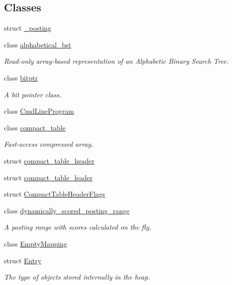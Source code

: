 \subsection*{Classes}
\begin{DoxyCompactItemize}
\item 
struct \mbox{\hyperlink{structirk_1_1__posting}{\+\_\+posting}}
\item 
class \mbox{\hyperlink{classirk_1_1alphabetical__bst}{alphabetical\+\_\+bst}}
\begin{DoxyCompactList}\small\item\em Read-\/only array-\/based representation of an Alphabetic Binary Search Tree. \end{DoxyCompactList}\item 
class \mbox{\hyperlink{classirk_1_1bitptr}{bitptr}}
\begin{DoxyCompactList}\small\item\em A bit pointer class. \end{DoxyCompactList}\item 
class \mbox{\hyperlink{classirk_1_1CmdLineProgram}{Cmd\+Line\+Program}}
\item 
class \mbox{\hyperlink{classirk_1_1compact__table}{compact\+\_\+table}}
\begin{DoxyCompactList}\small\item\em Fast-\/access compressed array. \end{DoxyCompactList}\item 
struct \mbox{\hyperlink{structirk_1_1compact__table__header}{compact\+\_\+table\+\_\+header}}
\item 
struct \mbox{\hyperlink{structirk_1_1compact__table__leader}{compact\+\_\+table\+\_\+leader}}
\item 
struct \mbox{\hyperlink{structirk_1_1CompactTableHeaderFlags}{Compact\+Table\+Header\+Flags}}
\item 
class \mbox{\hyperlink{classirk_1_1dynamically__scored__posting__range}{dynamically\+\_\+scored\+\_\+posting\+\_\+range}}
\begin{DoxyCompactList}\small\item\em A posting range with scores calculated on the fly. \end{DoxyCompactList}\item 
class \mbox{\hyperlink{classirk_1_1EmptyMapping}{Empty\+Mapping}}
\item 
struct \mbox{\hyperlink{structirk_1_1Entry}{Entry}}
\begin{DoxyCompactList}\small\item\em The type of objects stored internally in the heap. \end{DoxyCompactList}\item 

\end{DoxyCompactItemize}

